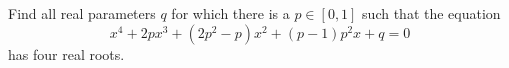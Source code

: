Find all real parameters $q$ for which there is a $p\in[0,1]$ such that the equation
$$x^4+2px^3+(2p^2-p)x^2+(p-1)p^2x+q=0$$has four real roots.